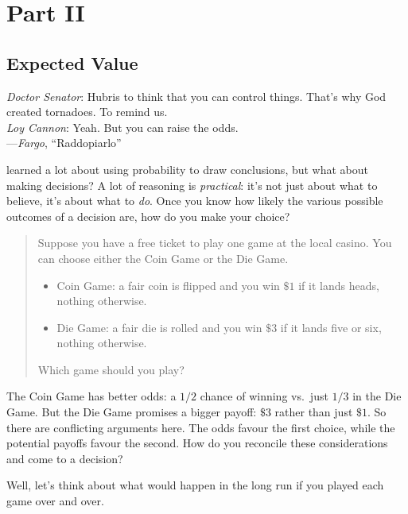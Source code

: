 \documentclass[justified]{tufte-book}
\providecommand{\tightlist}{%
  \setlength{\itemsep}{0pt}\setlength{\parskip}{0pt}}
\newenvironment{epigraph}%
{
\begin{flushright}    
\begin{minipage}{20em}
\begin{flushright}
\itshape
}%
{
\end{flushright}
\end{minipage}
\end{flushright}
}
\newenvironment{problem}{\begin{quote}\normalsize}{\end{quote}}
\theoremstyle{definition}
\theoremstyle{definition}
\theoremstyle{definition}
\theoremstyle{definition}
\theoremstyle{remark}
\begin{document}
\hypertarget{part-part-ii}{%
\part*{Part II}\label{part-part-ii}}

\hypertarget{expected-value}{%
\chapter{Expected Value}\label{expected-value}}

\begin{epigraph}
\emph{Doctor Senator}: Hubris to think that you can control things.
That's why God created tornadoes. To remind us.\\
\emph{Loy Cannon}: Yeah. But you can raise the odds.\\
---\emph{Fargo}, ``Raddopiarlo''
\end{epigraph}

 learned a lot about using probability to draw conclusions, but what about making decisions? A lot of reasoning is \emph{practical}: it's not just about what to believe, it's about what to \emph{do}. Once you know how likely the various possible outcomes of a decision are, how do you make your choice?

\begin{problem}
Suppose you have a free ticket to play one game at the local casino. You
can choose either the Coin Game or the Die Game.

\begin{itemize}
\tightlist
\item
  Coin Game: a fair coin is flipped and you win \(\$1\) if it lands
  heads, nothing otherwise.
\item
  Die Game: a fair die is rolled and you win \(\$3\) if it lands five or
  six, nothing otherwise.
\end{itemize}

Which game should you play?
\end{problem}

The Coin Game has better odds: a \(1/2\) chance of winning vs.~just \(1/3\) in the Die Game. But the Die Game promises a bigger payoff: \(\$3\) rather than just \(\$1\). So there are conflicting arguments here. The odds favour the first choice, while the potential payoffs favour the second. How do you reconcile these considerations and come to a decision?

Well, let's think about what would happen in the long run if you played each game over and over.
\end{document}

